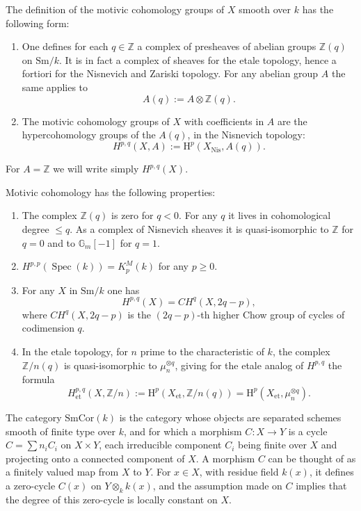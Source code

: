 \documentclass[11pt]{article}
\newcommand{\Z}{\mathbb Z}
\newcommand{\Gm}{\mathbb G_m}
\newcommand{\et}{\mathrm{et}}
\newcommand{\Nis}{\mathrm{Nis}}
\newcommand{\Sm}{\mathrm{Sm}}
\newcommand{\SmCor}{\mathrm{SmCor}}
\newcommand{\Spec}{\operatorname{Spec}}
\theoremstyle{deligne}
\newcommand{\heading}[1]{\vspace{0.7em}\noindent{\bfseries #1}\quad}
\begin{document}
\heading{1.2.} The definition of the motivic cohomology groups of \(X\) smooth over \(k\) has the following form:
\begin{enumerate}[label=(\alph*)]
\item One defines for each \(q\in\Z\) a complex of presheaves of abelian groups \(\Z(q)\) on \(\Sm/k\). It is in fact a complex of sheaves for the etale topology, hence a fortiori for the Nisnevich and Zariski topology. For any abelian group \(A\) the same applies to
\[
  A(q):=A\otimes\Z(q).
\]
\item The motivic cohomology groups of \(X\) with coefficients in \(A\) are the hypercohomology groups of the \(A(q)\), in the Nisnevich topology:
\[
  H^{p,q}(X,A):=\mathrm H^p(X_{\Nis},A(q)).
\]
\end{enumerate}
For \(A=\Z\) we will write simply \(H^{p,q}(X)\).

Motivic cohomology has the following properties:
\begin{enumerate}[label=\arabic*.]
\item The complex \(\Z(q)\) is zero for \(q<0\). For any \(q\) it lives in cohomological degree \(\le q\). As a complex of Nisnevich sheaves it is quasi-isomorphic to \(\Z\) for \(q=0\) and to \(\Gm[-1]\) for \(q=1\).
\item \(H^{p,p}(\Spec(k))=K_p^M(k)\) for any \(p\ge0\).
\item For any \(X\) in \(\Sm/k\) one has
\[
  H^{p,q}(X)=CH^q(X,2q-p),
\]
where \(CH^q(X,2q-p)\) is the \((2q-p)\)-th higher Chow group of cycles of codimension \(q\).
\item In the etale topology, for \(n\) prime to the characteristic of \(k\), the complex \(\Z/n(q)\) is quasi-isomorphic to \(\mu_n^{\otimes q}\), giving for the etale analog of \(H^{p,q}\) the formula
\[
  H^{p,q}_{\et}(X,\Z/n):=\mathrm H^p(X_{\et},\Z/n(q))
  =\mathrm H^p(X_{\et},\mu_n^{\otimes q}).
\]
\end{enumerate}

\heading{1.3.} The category \(\SmCor(k)\) is the category whose objects are separated schemes smooth of finite type over \(k\), and for which a morphism \(C:X\to Y\) is a cycle \(C=\sum n_i C_i\) on \(X\times Y\), each irreducible component \(C_i\) being finite over \(X\) and projecting onto a connected component of \(X\). A morphism \(C\) can be thought of as a finitely valued map from \(X\) to \(Y\). For \(x\in X\), with residue field \(k(x)\), it defines a zero-cycle \(C(x)\) on \(Y\otimes_k k(x)\), and the assumption made on \(C\) implies that the degree of this zero-cycle is locally constant on \(X\).
\end{document}

